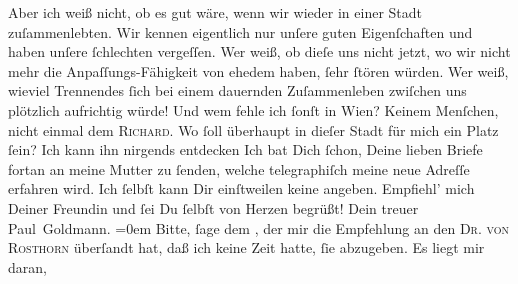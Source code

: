 \begin{ledgroupsized}[t]{13cm}
               Aber ich \strikeout{\textcolor{gray}{×}} weiß nicht, ob es gut wäre, wenn wir wieder in einer Stadt {\pb}zuſammenlebten. Wir kennen eigentlich nur unſere
               guten Eigenſchaften und haben unſere ſchlechten vergeſſen. Wer weiß,  ob dieſe uns nicht jetzt, wo wir nicht mehr die
               Anpaſſungs-Fähigkeit von ehedem haben, ſehr ſtören  würden. Wer weiß,  wieviel
               Trennendes ſich bei einem dauernden Zuſammenleben zwiſchen uns plötzlich aufrichtig
               würde! Und wem fehle ich ſonſt in Wien? Keinem
               Menſchen, nicht einmal dem \textsc{Richard}. Wo ſoll überhaupt in dieſer Stadt für mich ein Platz ſein? Ich kann ihn nirgends entdecken{\dotsfive}\pend
           \pstart
           Ich  bat Dich ſchon, Deine {\pb}lieben Briefe fortan
               an meine Mutter zu ſenden,
               welche telegraphiſch meine neue Adreſſe erfahren wird. Ich ſelbſt kann Dir
               einſtweilen keine angeben.\pend
           \pstart
           Empfiehl’ mich Deiner Freundin und ſei Du ſelbſt von Herzen begrüßt!\pend
           \pstart
           Dein treuer {\\[\baselineskip]}\spacefill\mbox{Paul Goldmann.}\pend
           \leftskip=0em{}\pstart
           \noindent{}Bitte, ſage dem \label{K_L02861-5v}\label{K_L02861-5h}, der mir die Empfehlung an den \textsc{Dr. von Rosthorn} überſandt hat, daß ich keine Zeit hatte, ſie abzugeben. Es liegt mir daran,

\end{ledgroupsized}
